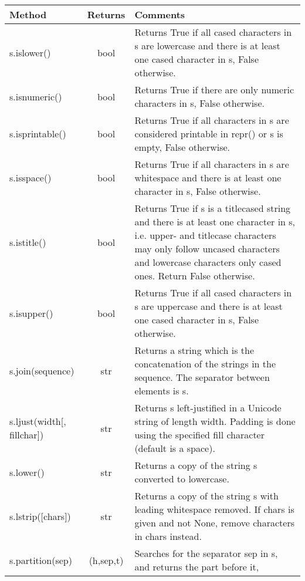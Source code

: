 \begin{center}
{\small
\begin{tabular}{|l|c|p{2.2in}|} \hline
{\bf Method} & {\bf Returns} & {\bf Comments} \\ \hline\hline

\hline
       s.islower() & bool
&     
       Returns True if all cased characters in s are lowercase and there is
       at least one cased character in s, False otherwise.   
\\ \hline
       s.isnumeric() & bool
&   
       Returns True if there are only numeric characters in s,
       False otherwise.
\\ \hline
       s.isprintable() & bool
&       
       Returns True if all characters in s are considered
       printable in repr() or s is empty, False otherwise.
\\ \hline
       s.isspace() & bool
&      
       Returns True if all characters in s are whitespace
       and there is at least one character in s, False otherwise.
\\ \hline
       s.istitle() & bool
&       
       Returns True if s is a titlecased string and there is at least one
       character in s, i.e. upper- and titlecase characters may only
       follow uncased characters and lowercase characters only cased ones.
       Return False otherwise.
\\ \hline
       s.isupper() & bool
&       
       Returns True if all cased characters in s are uppercase and there is
       at least one cased character in s, False otherwise.  
\\ \hline
       s.join(sequence) & str
&       
       Returns a string which is the concatenation of the strings in the
       sequence.  The separator between elements is s.
\\ \hline
       s.ljust(width[, fillchar]) & str
&      
       Returns s left-justified in a Unicode string of length width. Padding is
       done using the specified fill character (default is a space).
\\ \hline
       s.lower() & str
&      
       Returns a copy of the string s converted to lowercase.
\\ \hline
       s.lstrip([chars]) & str
&      
       Returns a copy of the string s with leading whitespace removed.
       If chars is given and not None, remove characters in chars instead. 
\\ \hline
       s.partition(sep) & (h,sep,t)
&       
       Searches for the separator sep in s, and returns the part before it,

\end{tabular}}
\end{center}
